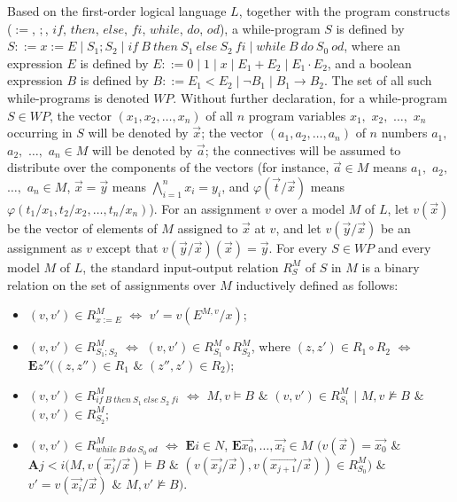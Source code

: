 \documentclass[a4paper,11pt]{article}
\begin{document}
Based on the first-order logical language $L$, together with the program constructs ($:=$, $;$, $if$, $then$, $else$, $fi$, $while$, $do$, $od$), a while-program $S$ is defined by $S ::= x := E \mid S_1;S_2 \mid if\ B\ then\ S_1\ else\ S_2\ fi \mid while\ B\ do\ S_0\ od$, where an expression $E$ is defined by $E ::= 0 \mid 1 \mid x \mid E_1+E_2 \mid E_1\cdot E_2$, and a boolean expression $B$ is defined by $B ::= E_1 < E_2 \mid \neg B_1 \mid B_1\rightarrow B_2$. The set of all such while-programs is denoted $WP$. Without further declaration, for a while-program $S\in WP$, the vector $(x_1, x_2, \ldots, x_n)$ of all $n$ program variables $x_1,$ $x_2,$ $\ldots,$ $x_n$ occurring in $S$ will be denoted by $\vec{x}$; the vector $(a_1,a_2,\ldots,a_n)$ of $n$ numbers $a_1,$ $a_2,$ $\ldots,$ $a_n\in M$ will be denoted by $\vec{a}$; the connectives will be assumed to distribute over the components of the vectors (for instance, $\vec{a}\in M$ means $a_1,$ $a_2,$ $\ldots,$ $a_n\in M$, $\vec{x} = \vec{y}$ means $\bigwedge_{i = 1}^{n} x_i = y_i$, and $\varphi(\vec{t}/\vec{x})$ means $\varphi(t_1/x_1,t_2/x_2,\ldots,t_n/x_n)$). For an assignment $v$ over a model $M$ of $L$, let $v(\vec{x})$ be the vector of elements of $M$ assigned to $\vec{x}$ at $v$, and let $v(\vec{y}/\vec{x})$ be an assignment as $v$ except that $v(\vec{y}/\vec{x})(\vec{x}) = \vec{y}$. For every $S\in WP$ and every model $M$ of $L$, the standard input-output relation $R_S^M$ of $S$ in $M$ is a binary relation on the set of assignments over $M$ inductively defined as follows:
\begin{itemize}
  \item $(v,v')\in R_{x:=E}^{M}$ $\Leftrightarrow$ $v'=v(E^{M,v}/x)$;
  \item $(v,v')\in R_{S_1;S_2}^{M}$ $\Leftrightarrow$ $(v,v')\in R_{S_1}^{M}\circ R_{S_2}^{M}$, where $(z,z')\in R_1\circ R_2$ $\Leftrightarrow$ $\textbf{E} z'' ( (z,z'')\in R_1$ $\&$ $(z'',z')\in R_2 )$;
  \item $(v,v')\in R_{if\ B\ then\ S_1\ else\ S_2\ fi}^{M}$ $\Leftrightarrow$ $M,v\models B$ $\&$ $(v,v')\in R_{S_1}^{M}$ $|$ $M,v\not\models B$ $\&$ $(v,v')\in R_{S_2}^{M}$;
  \item $(v,v')\in R_{while\ B\ do\ S_{0}\ od}^{M}$ $\Leftrightarrow$ $\textbf{E} i\in N$, $\textbf{E}\vec{x_0},\ldots,\vec{x_i} \in M$ $( v(\vec{x}) = \vec{x_0}$ $\&$ $\textbf{A} j < i ( M,v(\vec{x_j}/\vec{x})\models B$ $\&$ $(v(\vec{x_j}/\vec{x}), v(\vec{x_{j+1}}/\vec{x}))\in R_{S_0}^{M} ) $ $\&$ $v' = v(\vec{x_i}/\vec{x})$ $\&$ $M,v'\not\models B )$.
\end{itemize}
\end{document}
